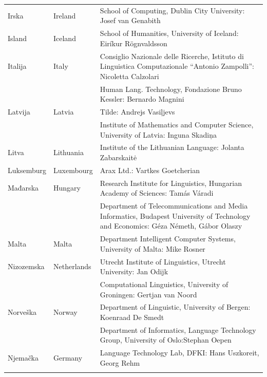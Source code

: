 \begin{longtable}{llp{115mm}}
   Irska & \textcolor{grey1}{Ireland} & School of Computing, Dublin City University: Josef van Genabith\\ \addlinespace
  Island & \textcolor{grey1}{Iceland} & School of Humanities, University of Iceland: Eiríkur Rögnvaldsson\\ \addlinespace
  Italija & \textcolor{grey1}{Italy} & Consiglio Nazionale delle Ricerche, Istituto di Linguistica Computazionale \newline “Antonio Zampolli”: Nicoletta Calzolari\\ \addlinespace
  & & Human Lang. Technology, Fondazione Bruno Kessler: Bernardo Magnini\\ \addlinespace 
  Latvija & \textcolor{grey1}{Latvia} & Tilde: Andrejs Vasiļjevs\\ \addlinespace 
  & & Institute of Mathematics and Computer Science, University of Latvia: Inguna Skadiņa\\ \addlinespace
  Litva & \textcolor{grey1}{Lithuania} & Institute of the Lithuanian Language: Jolanta Zabarskaitė\\ \addlinespace
  Luksemburg & \textcolor{grey1}{Luxembourg} & Arax Ltd.: Vartkes Goetcherian\\ \addlinespace
  Mađarska & \textcolor{grey1}{Hungary} & Research Institute for Linguistics, Hungarian Academy of Sciences: Tamás Váradi\\  \addlinespace
  & & Department of Telecommunications and Media Informatics, Budapest University of Technology and Economics: Géza Németh, Gábor Olaszy\\ \addlinespace
  Malta & \textcolor{grey1}{Malta} & Department Intelligent Computer Systems, University of Malta: Mike Rosner\\ \addlinespace
   Nizozemska & \textcolor{grey1}{Netherlands} & Utrecht Institute of Linguistics, Utrecht University: Jan Odijk\\ \addlinespace 
  & & Computational Linguistics, University of Groningen: Gertjan van Noord\\ \addlinespace
  Norveška & \textcolor{grey1}{Norway} & Department of Linguistic, University of Bergen: Koenraad De Smedt\\ \addlinespace 
  & & Department of Informatics, Language Technology Group, University of Oslo:\newline Stephan Oepen \\ \addlinespace
  Njemačka & \textcolor{grey1}{Germany} & Language Technology Lab, DFKI: Hans Uszkoreit, Georg Rehm\\ \addlinespace

\end{longtable}
